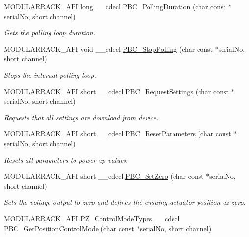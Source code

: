 \begin{DoxyCompactItemize}
M\+O\+D\+U\+L\+A\+R\+R\+A\+C\+K\+\_\+\+A\+PI long \+\_\+\+\_\+cdecl \hyperlink{group___modular_piezo_ga85c732352eaf8e125977f5a08ab51b3d}{P\+B\+C\+\_\+\+Polling\+Duration} (char const $\ast$serial\+No, short channel)
\begin{DoxyCompactList}\small\item\em Gets the polling loop duration. \end{DoxyCompactList}\item 
M\+O\+D\+U\+L\+A\+R\+R\+A\+C\+K\+\_\+\+A\+PI void \+\_\+\+\_\+cdecl \hyperlink{group___modular_piezo_ga42fdc4f75c5a102e61da79ab52872a85}{P\+B\+C\+\_\+\+Stop\+Polling} (char const $\ast$serial\+No, short channel)
\begin{DoxyCompactList}\small\item\em Stops the internal polling loop. \end{DoxyCompactList}\item 
M\+O\+D\+U\+L\+A\+R\+R\+A\+C\+K\+\_\+\+A\+PI short \+\_\+\+\_\+cdecl \hyperlink{group___modular_piezo_ga2ddd9c279e5c22874dbd4bc62bbc1b39}{P\+B\+C\+\_\+\+Request\+Settings} (char const $\ast$serial\+No, short channel)
\begin{DoxyCompactList}\small\item\em Requests that all settings are download from device. \end{DoxyCompactList}\item 
M\+O\+D\+U\+L\+A\+R\+R\+A\+C\+K\+\_\+\+A\+PI short \+\_\+\+\_\+cdecl \hyperlink{group___modular_piezo_gac43a3cbd7450e4c306af61e093b27302}{P\+B\+C\+\_\+\+Reset\+Parameters} (char const $\ast$serial\+No, short channel)
\begin{DoxyCompactList}\small\item\em Resets all parameters to power-\/up values. \end{DoxyCompactList}\item 
M\+O\+D\+U\+L\+A\+R\+R\+A\+C\+K\+\_\+\+A\+PI short \+\_\+\+\_\+cdecl \hyperlink{group___modular_piezo_gaf20ddecab6cd55c82b8bda5270b69f53}{P\+B\+C\+\_\+\+Set\+Zero} (char const $\ast$serial\+No, short channel)
\begin{DoxyCompactList}\small\item\em Sets the voltage output to zero and defines the ensuing actuator position az zero. \end{DoxyCompactList}\item 
M\+O\+D\+U\+L\+A\+R\+R\+A\+C\+K\+\_\+\+A\+PI \hyperlink{group___common_gaa4ff718266308759b2633c56c9a813b1}{P\+Z\+\_\+\+Control\+Mode\+Types} \+\_\+\+\_\+cdecl \hyperlink{group___modular_piezo_ga5d7e65e5e165f8f690265b3ccf9febda}{P\+B\+C\+\_\+\+Get\+Position\+Control\+Mode} (char const $\ast$serial\+No, short channel)

\end{DoxyCompactItemize}

